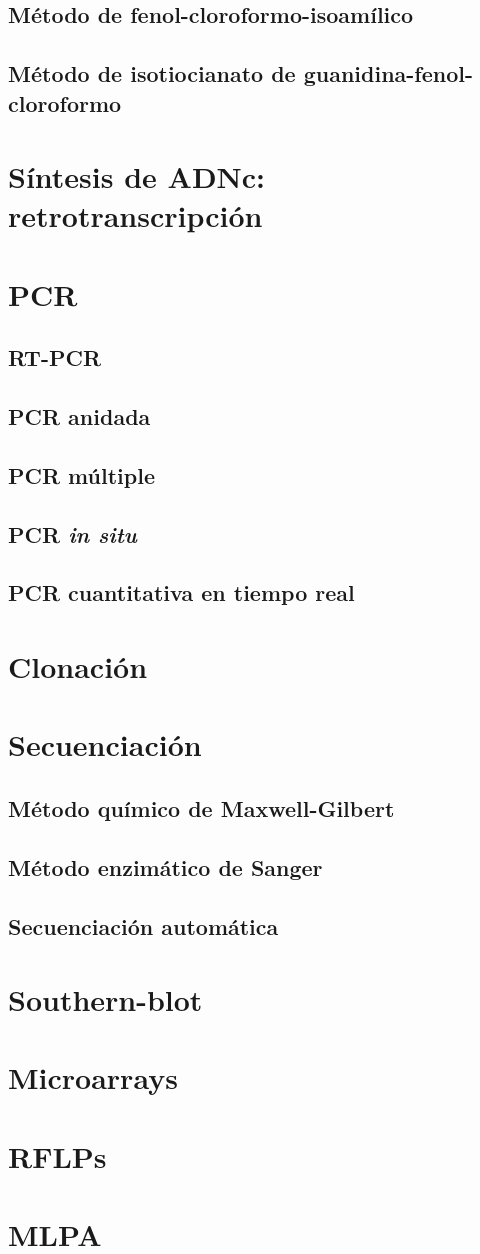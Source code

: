 \documentclass[10pt,a4paper,onecolumn,openany]{book}
\begin{document}
\subsection{Método de fenol-cloroformo-isoamílico}
\subsection{Método de isotiocianato de guanidina-fenol-cloroformo}
\section{Síntesis de ADNc: retrotranscripción}
\section{PCR}
\subsection{RT-PCR}
\subsection{PCR anidada}
\subsection{PCR múltiple}
\subsection{PCR \textit{in situ}}
\subsection{PCR cuantitativa en tiempo real}
\section{Clonación}
\section{Secuenciación}
\subsection{Método químico de Maxwell-Gilbert}
\subsection{Método enzimático de Sanger}
\subsection{Secuenciación automática}
\section{Southern-blot}
\section{Microarrays}
\section{RFLPs}
\section{MLPA}
\end{document}
